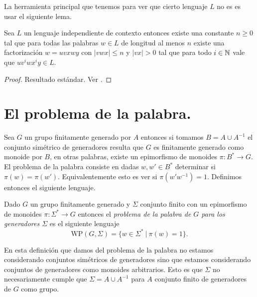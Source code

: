 \documentclass[tesis.tex]{subfiles}
\begin{document}
La herramienta principal que tenemos para ver que cierto lenguaje $L$ no es \ic es usar el siguiente lema.

\begin{lema}[Pumping] \label{pumping}
	Sea $L$ un lenguaje independiente de contexto entonces existe una constante $n \ge 0$ tal que para todas las palabras $w \in L$ de longitud al menos $n$ existe una factorización $w = uvxwy$ con $|vwx| \le n$ y $|vx| > 0$ tal que para todo $i \in \mathbb{N}$ vale que $uv^iwx^iy \in L$.
\end{lema}

\begin{proof}
	Resultado estándar. Ver \cite{hopcraft-ullman}.
\end{proof}



\section{El problema de la palabra.}\label{secc_wp}


Sea $G$ un grupo finitamente generado por $A$ entonces si tomamos $B = A \cup A^{-1}$ el conjunto simétrico de generadores resulta que $G$ es finitamente generado como monoide por $B$, en otras palabras, existe un epimorfismo de monoides $\pi:B^* \to G$.
El problema de la palabra consiste en dadas $w,w' \in B^*$ determinar si $\pi(w) {=} \pi(w')$.
Equivalentemente esto es ver si $\pi(w'w^{-1}) = 1$.
Definimos entonces el siguiente lenguaje.

\begin{deff}
	Dado $G$ un grupo finitamente generado 
	y $\Sigma$ conjunto finito con un epimorfismo de monoides $\pi:\Sigma^* \to G$ entonces
	el \emph{problema de la palabra de $G$ para los generadores $\Sigma$} es el siguiente lenguaje	
	\[ 
	\text{WP} (G, \Sigma) = \{ w \in \Sigma^* \ | \ \pi(w)= 1 \}.
	\]
\end{deff}

\begin{obs}
	En esta definición que damos del problema de la palabra no estamos considerando conjuntos simétricos de generadores sino que estamos considerando conjuntos de generadores como monoides arbitrarios.
	Esto es que $\Sigma$ no necesariamente cumple que $\Sigma = A \cup A^{-1}$ para $A$ conjunto finito de generadores de $G$ como grupo.
\end{obs}
\end{document}
